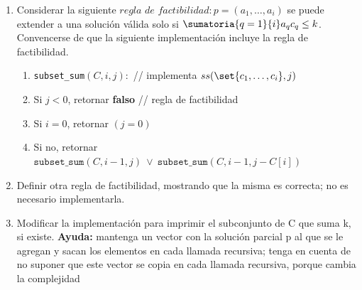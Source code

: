 {\begin{enunciado}{\ejercicio[SumaSubconjuntos BT]}
\begin{enumerate}[label=$\alph*)$]
      \item Considerar la siguiente $\textit{regla de factibilidad}: p = (a_1,\ldots, a_i)$ se puede
            extender a una solución válida solo si $\sumatoria{q=1}{i}a_q c_q \leq k$. Convencerse
            de que la siguiente implementación incluye la regla de factibilidad.
            \begin{enumerate}[label=\arabic*)]
              \item \texttt{subset\_sum}$(C,i, j):$ // implementa $ss(\set{c_1, \ldots, c_i},j)$
              \item Si $j < 0$, retornar \textbf{falso} // regla de factibilidad
              \item Si $i = 0$, retornar $(j = 0)$
              \item Si no, retornar $\texttt{subset\_sum}(C, i-1,j)~ \lor ~ \texttt{subset\_sum}(C, i-1,j - C[i])$
            \end{enumerate}

      \item Definir otra regla de factibilidad, mostrando que la misma es correcta; no es necesario
            implementarla.

      \item
            Modificar la implementación para imprimir el subconjunto de C que suma k, si existe.
            \textbf{Ayuda:} mantenga un vector con la solución parcial p al que se le agregan y sacan los
            elementos en cada llamada recursiva; tenga en cuenta de no suponer que este vector se
            copia en cada llamada recursiva, porque cambia la complejidad
    \end{enumerate}
  \end{enunciado}
}


